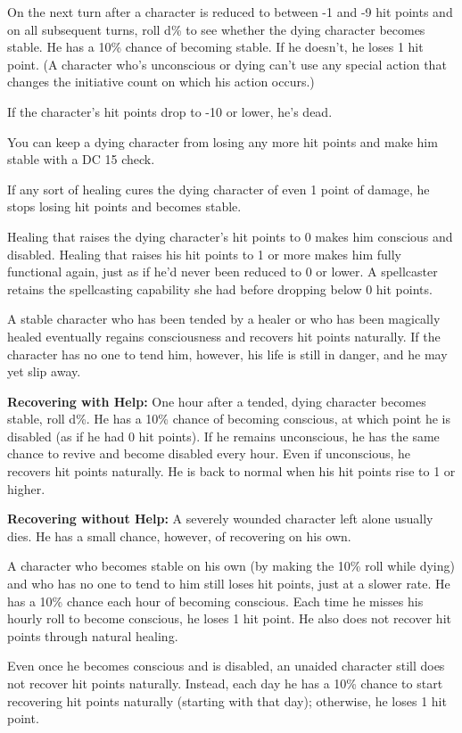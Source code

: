 On the next turn after a character is reduced to between -1 and -9 hit points and on all subsequent turns, roll d\% to see whether the dying character becomes stable. He has a 10\% chance of becoming stable. If he doesn't, he loses 1 hit point. (A character who's unconscious or dying can't use any special action that changes the initiative count on which his action occurs.)

If the character's hit points drop to -10 or lower, he's dead.

You can keep a dying character from losing any more hit points and make him stable with a DC 15  check.

If any sort of healing cures the dying character of even 1 point of damage, he stops losing hit points and becomes stable.

Healing that raises the dying character's hit points to 0 makes him conscious and disabled. Healing that raises his hit points to 1 or more makes him fully functional again, just as if he'd never been reduced to 0 or lower. A spellcaster retains the spellcasting capability she had before dropping below 0 hit points.

A stable character who has been tended by a healer or who has been magically healed eventually regains consciousness and recovers hit points naturally. If the character has no one to tend him, however, his life is still in danger, and he may yet slip away.

\textbf{Recovering with Help:} One hour after a tended, dying character becomes stable, roll d\%. He has a 10\% chance of becoming conscious, at which point he is disabled (as if he had 0 hit points). If he remains unconscious, he has the same chance to revive and become disabled every hour. Even if unconscious, he recovers hit points naturally. He is back to normal when his hit points rise to 1 or higher.

\textbf{Recovering without Help:} A severely wounded character left alone usually dies. He has a small chance, however, of recovering on his own. 

A character who becomes stable on his own (by making the 10\% roll while dying) and who has no one to tend to him still loses hit points, just at a slower rate. He has a 10\% chance each hour of becoming conscious. Each time he misses his hourly roll to become conscious, he loses 1 hit point. He also does not recover hit points through natural healing.

Even once he becomes conscious and is disabled, an unaided character still does not recover hit points naturally. Instead, each day he has a 10\% chance to start recovering hit points naturally (starting with that day); otherwise, he loses 1 hit point.

